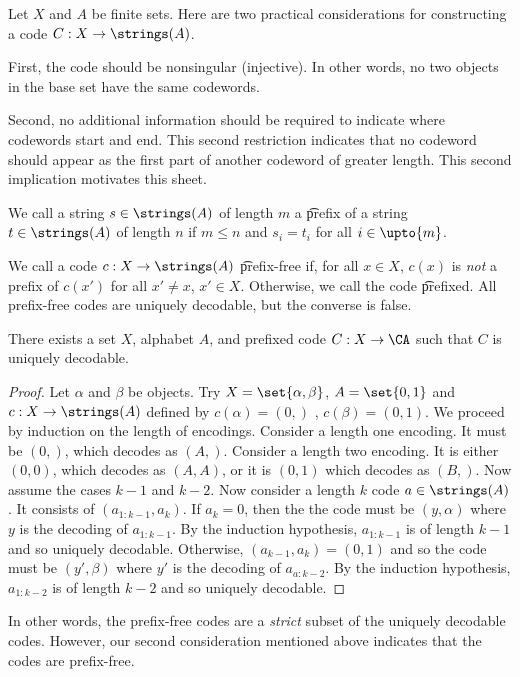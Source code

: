 

Let $X$ and $A$ be finite sets.
Here are two practical considerations for constructing a code $C: X \to \strings(A)$.

First, the code should be nonsingular (injective).
In other words, no two objects in the base set have the same codewords.

Second, no additional information should be required to indicate where codewords start and end.
This second restriction indicates that no codeword should appear as the first part of another codeword of greater length.
This second implication motivates this sheet.


We call a string $s \in \strings(A)$ of length $m$ a \t{prefix} of a string $t \in \strings(A)$ of length $n$ if $m \leq n$ and $s_i = t_i$ for all $i \in \upto{m}$.

We call a code $c: X \to \strings(A)$ \t{prefix-free} if, for all $x \in X$, $c(x)$ is \textit{not} a prefix of $c(x')$ for all $x' \neq x$, $x' \in X$.
Otherwise, we call the code \t{prefixed}.
All prefix-free codes are uniquely decodable, but the converse is false.

\begin{proposition}
  There exists a set $X$, alphabet $A$, and prefixed code $C: X \to \CA$ such that $C$ is uniquely decodable.
  \begin{proof}
  Let $\alpha$ and $\beta$ be objects.
    Try $X = \set{\alpha, \beta}$, $A = \set{0, 1}$ and $c: X \to \strings(A)$ defined by $c(\alpha) = (0,)$ , $c(\beta) = (0,1)$.
  We proceed by induction on the length of encodings.
  Consider a length one encoding.
  It must be $(0,)$, which decodes as $(A,)$.
  Consider a length two encoding.
  It is either $(0,0)$, which decodes as $(A,A)$, or it is $(0,1)$ which decodes as $(B,)$.
  Now assume the cases $k-1$ and $k-2$.
  Now consider a length $k$ code $a \in \strings(A)$.
  It consists of $(a_{1:k-1},a_k)$.
  If $a_k = 0$, then the the code must be $(y, \alpha)$ where $y$ is the decoding of $a_{1:k-1}$.
  By the induction hypothesis, $a_{1:k-1}$ is of length $k-1$ and so uniquely decodable.
  Otherwise, $(a_{k-1}, a_k) = (0,1)$ and so the code must be $(y', \beta)$ where $y'$ is the decoding of $a_{a:k-2}$.
  By the induction hypothesis, $a_{1:k-2}$ is of length $k-2$ and so uniquely decodable.
  \end{proof}
\end{proposition}

In other words, the prefix-free codes are a \textit{strict} subset of the uniquely decodable codes.
However, our second consideration mentioned above indicates that the  codes are prefix-free.

